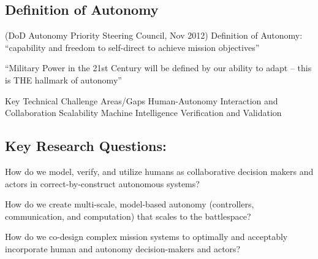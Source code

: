 
\subsection*{Definition of Autonomy}
(DoD Autonomy Priority Steering Council, Nov 2012)
Definition of Autonomy: “capability and freedom to self-direct to achieve mission objectives”

“Military Power in the 21st Century will be defined by our ability to adapt – this is THE hallmark of autonomy”

Key Technical Challenge Areas/Gaps
Human-Autonomy Interaction and Collaboration
Scalability
Machine Intelligence
Verification and Validation

\subsection*{Key Research Questions:}

How do we model, verify, and utilize humans as collaborative decision makers and actors in correct-by-construct autonomous systems?

How do we create multi-scale, model-based autonomy (controllers, communication, and computation) that scales to the battlespace?

How do we co-design complex mission systems to optimally and acceptably incorporate human and autonomy decision-makers and actors?


